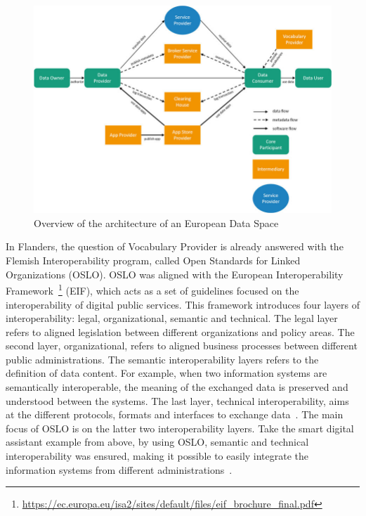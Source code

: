 \documentclass[manuscript]{acmart}
\begin{document}
\begin{figure}[h]
  \centering
  \includegraphics[width=\linewidth]{images/data-space}
  \caption{Overview of the architecture of an European Data Space\protect\footnotemark}
  \label{architectureDataSpace}
\end{figure}


In Flanders, the question of Vocabulary Provider is already answered with the Flemish Interoperability program, called Open Standards for Linked Organizations (OSLO). 
OSLO was aligned with the European Interoperability Framework~\footnote{\url{https://ec.europa.eu/isa2/sites/default/files/eif_brochure_final.pdf}} (EIF), which acts as a set of guidelines focused on the interoperability of digital public services.
This framework introduces four layers of interoperability: legal, organizational, semantic and technical.
The legal layer refers to aligned legislation between different organizations and policy areas. 
The second layer, organizational, refers to aligned business processes between different public administrations. 
The semantic interoperability layers refers to the definition of data content. 
For example, when two information systems are semantically interoperable, the meaning of the exchanged data is preserved and understood between the systems. 
The last layer, technical interoperability, aims at the different protocols, formats and interfaces to exchange data~\cite{eif}.
The main focus of OSLO is on the latter two interoperability layers.
Take the smart digital assistant example from above, by using OSLO, semantic and technical interoperability was ensured, making it possible to easily integrate the information systems from different administrations~\cite{buyle2018semantics}.
\end{document}
